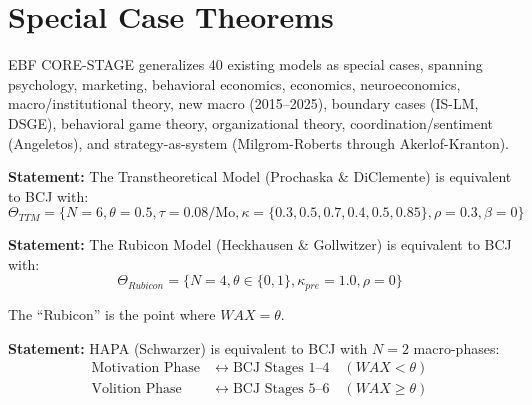 
\section{Special Case Theorems}
\label{sec:bcj-theorems}

EBF CORE-STAGE generalizes 40 existing models as special cases, spanning psychology, marketing, behavioral economics, economics, neuroeconomics, macro/institutional theory, new macro (2015--2025), boundary cases (IS-LM, DSGE), behavioral game theory, organizational theory, coordination/sentiment (Angeletos), and strategy-as-system (Milgrom-Roberts through Akerlof-Kranton).

\begin{tcolorbox}[colback=green!5!white, colframe=green!75!black,
    title=Theorem BCJ-T1: TTM as Special Case]
\textbf{Statement:} The Transtheoretical Model (Prochaska \& DiClemente) is equivalent to BCJ with:
\begin{equation}
\Theta_{TTM} = \{N=6, \theta=0.5, \tau=0.08/\text{Mo}, \kappa=\{0.3, 0.5, 0.7, 0.4, 0.5, 0.85\}, \rho=0.3, \beta=0\}
\end{equation}
\end{tcolorbox}

\begin{tcolorbox}[colback=green!5!white, colframe=green!75!black,
    title=Theorem BCJ-T2: Rubicon Model as Special Case]
\textbf{Statement:} The Rubicon Model (Heckhausen \& Gollwitzer) is equivalent to BCJ with:
\begin{equation}
\Theta_{Rubicon} = \{N=4, \theta \in \{0,1\}, \kappa_{pre}=1.0, \rho=0\}
\end{equation}

The ``Rubicon'' is the point where $WAX = \theta$.
\end{tcolorbox}

\begin{tcolorbox}[colback=green!5!white, colframe=green!75!black,
    title=Theorem BCJ-T3: HAPA as Special Case]
\textbf{Statement:} HAPA (Schwarzer) is equivalent to BCJ with $N=2$ macro-phases:
\begin{align}
\text{Motivation Phase} &\leftrightarrow \text{BCJ Stages 1--4} \quad (WAX < \theta) \\
\text{Volition Phase} &\leftrightarrow \text{BCJ Stages 5--6} \quad (WAX \geq \theta)
\end{align}
\end{tcolorbox}

